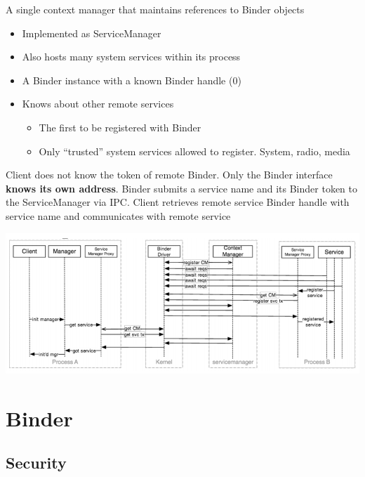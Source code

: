 \documentclass{article}
\begin{document}
\begin{flushleft}
A	single	context	manager that	maintains	references	to	Binder	objects
\begin{itemize}  
  \item Implemented as ServiceManager
  \item Also hosts many system services within its process 
  \item A Binder instance with a known Binder handle (0) 
  \item Knows about other remote services 
  \begin{itemize}
    \item The first to be registered with Binder 
    \item Only “trusted” system services allowed to register. System, radio, media
  \end{itemize}
\end{itemize}
Client does not know the token of remote Binder. Only the Binder interface \textbf{knows its own address}. Binder submits a service name and its Binder token to the ServiceManager via IPC. Client retrieves remote service Binder handle with service name and communicates with remote service
\end{flushleft}

\begin{center}
  \includegraphics[scale=0.5]{service_manager.png}
\end{center}

\section{Binder}

\subsection{Security}
\end{document}

